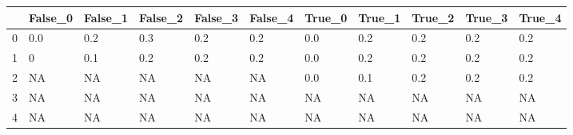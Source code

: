 \begin{tabular}{lllllllllll}
\toprule
{} & False\_0 & False\_1 & False\_2 & False\_3 & False\_4 & True\_0 & True\_1 & True\_2 & True\_3 & True\_4 \\ \hline
\midrule
0 &     0.0 &     0.2 &     0.3 &     0.2 &     0.2 &    0.0 &    0.2 &    0.2 &    0.2 &    0.2 \\ \hline
1 &       0 &     0.1 &     0.2 &     0.2 &     0.2 &    0.0 &    0.2 &    0.2 &    0.2 &    0.2 \\ \hline
2 &      NA &      NA &      NA &      NA &      NA &    0.0 &    0.1 &    0.2 &    0.2 &    0.2 \\ \hline
3 &      NA &      NA &      NA &      NA &      NA &     NA &     NA &     NA &     NA &     NA \\ \hline
4 &      NA &      NA &      NA &      NA &      NA &     NA &     NA &     NA &     NA &     NA \\ \hline
\bottomrule
\end{tabular}
